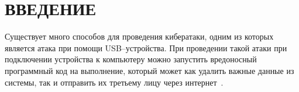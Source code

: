 \chapter*{ВВЕДЕНИЕ}

Существует много способов для проведения кибератаки, одним из которых является атака при помощи USB--устройства. При проведении такой атаки при подключении устройства к компьютеру можно запустить вредоносный программный код на выполнение, который может как удалить важные данные из системы, так и отправить их третьему лицу через интернет~\cite{usbmalware}.
